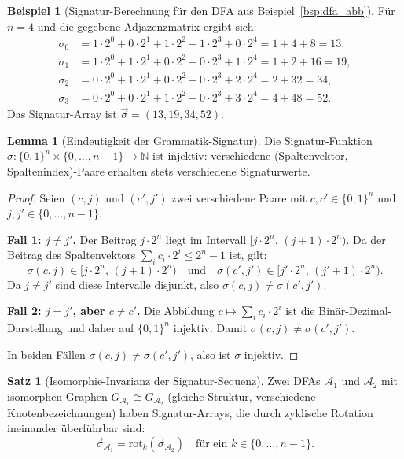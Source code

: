 ﻿\documentclass[a4paper,12pt]{article}
\theoremstyle{definition}
\newtheorem{beispiel}{Beispiel}
\newtheorem{satz}{Satz}
\newtheorem{lemma}{Lemma}
\begin{document}
\begin{beispiel}[Signatur-Berechnung f\"ur den DFA aus Beispiel~\ref{bsp:dfa_abb}]
F\"ur $n = 4$ und die gegebene Adjazenzmatrix ergibt sich:
\begin{align*}
\sigma_0 &= 1 \cdot 2^0 + 0 \cdot 2^1 + 1 \cdot 2^2 + 1 \cdot 2^3
           + 0 \cdot 2^4 = 1 + 4 + 8 = 13, \\
\sigma_1 &= 1 \cdot 2^0 + 1 \cdot 2^1 + 0 \cdot 2^2 + 0 \cdot 2^3
           + 1 \cdot 2^4 = 1 + 2 + 16 = 19, \\
\sigma_2 &= 0 \cdot 2^0 + 1 \cdot 2^1 + 0 \cdot 2^2 + 0 \cdot 2^3
           + 2 \cdot 2^4 = 2 + 32 = 34, \\
\sigma_3 &= 0 \cdot 2^0 + 0 \cdot 2^1 + 1 \cdot 2^2 + 0 \cdot 2^3
           + 3 \cdot 2^4 = 4 + 48 = 52.
\end{align*}
Das Signatur-Array ist $\vec{\sigma} = (13, 19, 34, 52)$.
\end{beispiel}

\begin{lemma}[Eindeutigkeit der Grammatik-Signatur]
\label{lem:eindeutigkeit}
Die Signatur-Funktion
$\sigma: \{0,1\}^n \times \{0,\ldots,n-1\} \to \mathbb{N}$ ist injektiv:
verschiedene (Spaltenvektor, Spaltenindex)-Paare erhalten stets verschiedene
Signaturwerte.
\end{lemma}

\begin{proof}
Seien $(c, j)$ und $(c', j')$ zwei verschiedene Paare mit $c, c' \in \{0,1\}^n$
und $j, j' \in \{0,\ldots,n-1\}$.

\textbf{Fall 1: $j \neq j'$.}
Der Beitrag $j \cdot 2^n$ liegt im Intervall $[j \cdot 2^n,\, (j+1) \cdot 2^n)$.
Da der Beitrag des Spaltenvektors $\sum_i c_i \cdot 2^i \leq 2^n - 1$ ist,
gilt:
\[
\sigma(c, j) \in [j \cdot 2^n,\, (j+1) \cdot 2^n)
\quad \text{und} \quad
\sigma(c', j') \in [j' \cdot 2^n,\, (j'+1) \cdot 2^n).
\]
Da $j \neq j'$ sind diese Intervalle disjunkt, also $\sigma(c,j) \neq \sigma(c',j')$.

\textbf{Fall 2: $j = j'$, aber $c \neq c'$.}
Die Abbildung $c \mapsto \sum_i c_i \cdot 2^i$ ist die Bin\"ar-Dezimal-Darstellung
und daher auf $\{0,1\}^n$ injektiv. Damit $\sigma(c,j) \neq \sigma(c',j')$.

In beiden F\"allen $\sigma(c,j) \neq \sigma(c',j')$, also ist $\sigma$ injektiv.
\end{proof}

\begin{satz}[Isomorphie-Invarianz der Signatur-Sequenz]
\label{satz:isoinv}
Zwei DFAs $\mathcal{A}_1$ und $\mathcal{A}_2$ mit isomorphen Graphen
$G_{\mathcal{A}_1} \cong G_{\mathcal{A}_2}$ (gleiche Struktur, verschiedene
Knotenbezeichnungen) haben Signatur-Arrays, die durch zyklische Rotation
ineinander \"uberf\"uhrbar sind:
\[
\vec{\sigma}_{\mathcal{A}_1} = \mathrm{rot}_k(\vec{\sigma}_{\mathcal{A}_2})
\quad \text{f\"ur ein } k \in \{0, \ldots, n-1\}.
\]
\end{satz}
\end{document}
